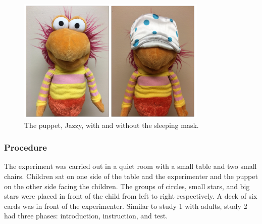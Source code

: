 \documentclass[floatsintext,man]{apa6}
\theoremstyle{definition}
\theoremstyle{definition}
\theoremstyle{definition}
\theoremstyle{remark}
\begin{document}
\begin{figure}
\centering
\includegraphics{figs/jazzy-1.pdf}
\caption{\label{fig:jazzy}The puppet, Jazzy, with and without the sleeping
mask.}
\end{figure}

\subsubsection{Procedure}\label{procedure-1}

The experiment was carried out in a quiet room with a small table and
two small chairs. Children sat on one side of the table and the
experimenter and the puppet on the other side facing the children. The
groups of circles, small stars, and big stars were placed in front of
the child from left to right respectively. A deck of six cards was in
front of the experimenter. Similar to study 1 with adults, study 2 had
three phases: introduction, instruction, and test.
\end{document}
